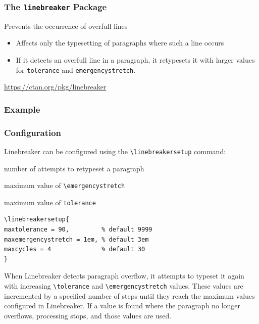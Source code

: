 \begin{frame}[fragile]
  \frametitle{The \texttt{linebreaker} Package}
  Prevents the occurrence of overfull lines
  \begin{itemize}
    \item Affects only the typesetting of paragraphs where such a line occurs
    \item If it detects an overfull line in a paragraph, it retypesets it with larger values for
      \verb|tolerance| and \verb|emergencystretch|.
  \end{itemize}
  \url{https://ctan.org/pkg/linebreaker}
\end{frame}

\begin{frame}
  \frametitle{Example}
\end{frame}

\begin{frame}[fragile]
  \frametitle{Configuration}
  Linebreaker can be configured using the \verb|\linebreakersetup| command:
  \begin{description}[maxemergencystretch]
    \item[maxcycles] number of attempts to retypeset a paragraph
    \item[maxemergencystretch] maximum value of \verb|\emergencystretch|
    \item[maxtolerance]  maximum value of \verb|tolerance|
  \end{description}
\begin{verbatim}
\linebreakersetup{
maxtolerance = 90,         % default 9999
maxemergencystretch = 1em, % default 3em
maxcycles = 4              % default 30
}
\end{verbatim}

\end{frame}

When Linebreaker detects paragraph overflow, it attempts to typeset it again
with increasing \verb|\tolerance| and \verb|\emergencystretch| values. These values are
incremented by a specified number of steps until they reach the maximum values
configured in Linebreaker. If a value is found where the paragraph no longer
overflows, processing stops, and those values are used.

